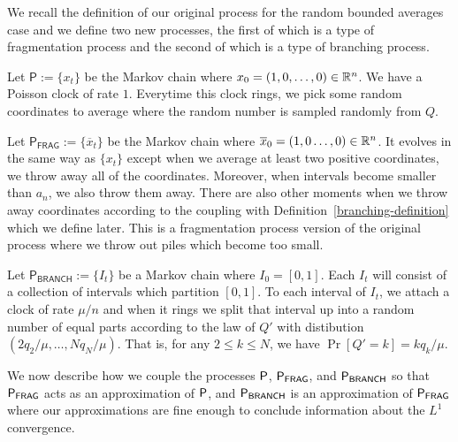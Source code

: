 \documentclass[12pt]{article}
\begin{document}
We recall the definition of our original process for the random bounded averages case and we define two new processes, the first of which is a type of fragmentation process and the second of which is a type of branching process. 

\begin{defn} 
	Let $\mathsf{P} := \{x_t\}$ be the Markov chain where $x_0 = (1, 0, \ldots, 0) \in \mathbb{R}^n$. We have a Poisson clock of rate $1$. Everytime this clock rings, we pick some random coordinates to average where the random number is sampled randomly from $Q$. 
\end{defn}

\begin{defn}  \label{fragmentation-definition}
	Let $\mathsf{P}_{\mathsf{FRAG}} := \{\overline{x}_t\}$ be the Markov chain where $\overline{x}_0 = (1, 0 \ldots, 0) \in \mathbb{R}^n$. It evolves in the same way as $\{x_t\}$ except when we average at least two positive coordinates, we throw away all of the coordinates. Moreover, when intervals become smaller than $a_n$, we also throw them away. There are also other moments when we throw away coordinates according to the coupling with Definition~\ref{branching-definition} which we define later. This is a fragmentation process version of the original process where we throw out piles which become too small. 
\end{defn}

\begin{defn}  \label{branching-definition}
	Let $\mathsf{P}_{\mathsf{BRANCH}} := \{I_t\}$ be a Markov chain where $I_0 = [0, 1]$. Each $I_t$ will consist of a collection of intervals which partition $[0, 1]$. To each interval of $I_t$, we attach a clock of rate $\mu / n$ and when it rings we split that interval up into a random number of equal parts according to the law of $Q'$ with distibution $(2q_2 / \mu, \ldots, Nq_N /\mu)$. That is, for any $2 \leq k \leq N$, we have $\Pr[Q' = k] = kq_k/\mu$. 
\end{defn}

We now describe how we couple the processes $\mathsf{P}$, $\mathsf{P}_{\mathsf{FRAG}}$, and $\mathsf{P}_{\mathsf{BRANCH}}$ so that $\mathsf{P}_{\mathsf{FRAG}}$ acts as an approximation of $\mathsf{P}$, and $\mathsf{P}_{\mathsf{BRANCH}}$ is an approximation of $\mathsf{P}_{\mathsf{FRAG}}$ where our approximations are fine enough to conclude information about the $L^1$ convergence. 
\end{document}
